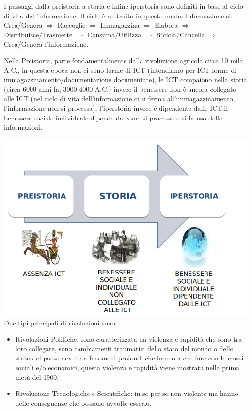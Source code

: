 \documentclass[a4page, 11pt]{article}
\begin{document}
I passaggi dalla preistoria a storia e infine iperstoria sono definiti
in base al ciclo di vita dell'informazione. Il ciclo è costruito in
questo modo: Informazione si: Crea/Genera $\Rightarrow$ Raccoglie $\Rightarrow$ Immagazzina $\Rightarrow$
Elabora $\Rightarrow$ Distribuisce/Trasmette $\Rightarrow$ Consuma/Utilizza $\Rightarrow$ Ricicla/Cancella $\Rightarrow$
Crea/Genera l'informazione.

Nella Preistoria, parte fondamentalmente dalla rivoluzione agricola
circa 10 mila A.C., in questa epoca non ci sono forme di ICT (intendiamo
per ICT forme di immagazzinamento/documentazione documentate), le ICT
compaiono nella storia (circa 6000 anni fa, 3000-4000 A.C.) invece il
benessere non è ancora collegato alle ICT (nel ciclo di vita
dell'informazione ci si ferma all'immagazzinamento, l'informazione non
si processa), l'iperstoria invece è dipendente dalle ICT:il 
benessere sociale-individuale dipende da come si
processa e si fa uso delle informazioni.

\includegraphics[scale=0.6]{image1.png}
\newline
Due tipi principali di rivoluzioni sono:

\begin{itemize}
	 
	\item
	Rivoluzioni Politiche: sono caratterizzata da violenza e rapidità che
	sono tra loro collegate, sono cambiamenti traumatici dello stato del
	mondo o dello stato del paese dovute a fenomeni profondi che hanno a
	che fare con le classi sociali e/o economici, questa violenza e
	rapidità viene mostrata nella prima metà del 1900.
	\item
	Rivoluzione Tecnologiche e Scientifiche: in se per se non violente ma
	hanno delle conseguenze che possono avvolte esserlo.
\end{itemize}
\end{document}
